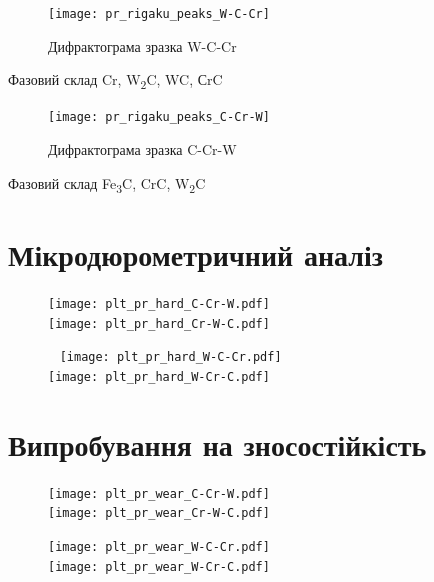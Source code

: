 \documentclass[12pt,aspectratio=43,hyperref={unicode}]{beamer}
\begin{document}
\begin{frame}
\begin{figure}[H]
\centering
\caption{Дифрактограма зразка W-C-Cr}
\texttt{[image: pr\_rigaku\_peaks\_W-C-Cr]}
\end{figure}
\begin{alertblock}{Фазовий склад}
\centering
Cr, W\textsubscript{2}C, WC, СrC
\end{alertblock}
\end{frame}

\begin{frame}
  \begin{figure}[H]
  \centering
  \caption{Дифрактограма зразка C-Cr-W}
  \texttt{[image: pr\_rigaku\_peaks\_C-Cr-W]}
  \end{figure}
  \begin{alertblock}{Фазовий склад}
  \centering
Fe\textsubscript{3}C, CrC, W\textsubscript{2}C
  \end{alertblock}
\end{frame}


\section{Мікродюрометричний аналіз}

\begin{frame}
\begin{figure} %
  \begin{minipage}[c]{0.49\textwidth}
    \texttt{[image: plt\_pr\_hard\_C-Cr-W.pdf]}\\[2mm]
    \texttt{[image: plt\_pr\_hard\_Cr-W-C.pdf]}
  \end{minipage}%
  \hfill
  \begin{minipage}[c]{0.49\textwidth}
    ~
    \texttt{[image: plt\_pr\_hard\_W-C-Cr.pdf]}\\[2mm]
    \texttt{[image: plt\_pr\_hard\_W-Cr-C.pdf]}
  \end{minipage}
\end{figure}
\end{frame}


\section{Випробування на зносостійкість}
\begin{frame}
\begin{figure}
  \begin{minipage}[c]{0.49\textwidth}
    \texttt{[image: plt\_pr\_wear\_C-Cr-W.pdf]}\\[2mm]
    \texttt{[image: plt\_pr\_wear\_Cr-W-C.pdf]}
  \end{minipage}%
  \hfill
  \begin{minipage}[c]{0.49\textwidth}
    \texttt{[image: plt\_pr\_wear\_W-C-Cr.pdf]}\\[2mm]
    \texttt{[image: plt\_pr\_wear\_W-Cr-C.pdf]}
  \end{minipage}
\end{figure}
\end{frame}
\end{document}
